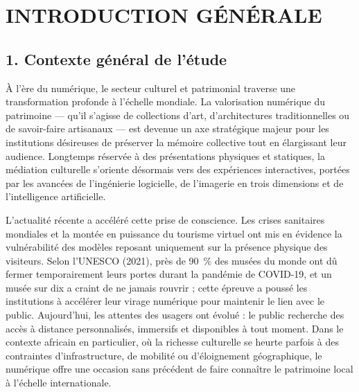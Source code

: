 \cleardoublepage
{}
\chapter*{INTRODUCTION GÉNÉRALE}

\section*{1. Contexte général de l'étude}

À l'ère du numérique, le secteur culturel et patrimonial traverse une
transformation profonde à l'échelle mondiale. La valorisation numérique du
patrimoine — qu'il s'agisse de collections d'art, d'architectures
traditionnelles ou de savoir-faire artisanaux — est devenue un axe stratégique
majeur pour les institutions désireuses de préserver la mémoire collective tout
en élargissant leur audience. Longtemps réservée à des présentations physiques
et statiques, la médiation culturelle s'oriente désormais vers des expériences
interactives, portées par les avancées de l'ingénierie logicielle, de l'imagerie
en trois dimensions et de l'intelligence artificielle.

L'actualité récente a accéléré cette prise de conscience. Les crises sanitaires
mondiales et la montée en puissance du tourisme virtuel ont mis en évidence la
vulnérabilité des modèles reposant uniquement sur la présence physique des
visiteurs. Selon l'UNESCO (2021), près de 90~\% des musées du monde ont dû
fermer temporairement leurs portes durant la pandémie de COVID-19, et un musée
sur dix a craint de ne jamais rouvrir ; cette épreuve a poussé les institutions
à accélérer leur virage numérique pour maintenir le lien avec le public.
Aujourd'hui, les attentes des usagers ont évolué : le public recherche des accès
à distance personnalisés, immersifs et disponibles à tout moment. Dans le
contexte africain en particulier, où la richesse culturelle se heurte parfois à
des contraintes d'infrastructure, de mobilité ou d'éloignement géographique, le
numérique offre une occasion sans précédent de faire connaître le patrimoine
local à l'échelle internationale.

